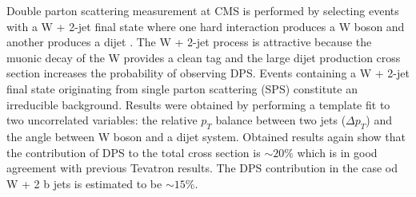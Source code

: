 \par Double parton scattering measurement at CMS is performed by selecting events with a W + 2-jet final state where one hard interaction produces a W boson and another produces a dijet \cite{Chatrchyan:2013xxa}. The W + 2-jet process is attractive because the muonic decay of the W provides a clean tag and the large dijet production cross section increases the probability of observing DPS. Events containing a W + 2-jet final state originating from single parton scattering (SPS) constitute an irreducible background. Results were obtained by performing a template fit to two uncorrelated variables: the relative $p_T$ balance between two jets ($\Delta p_T$) and the angle between W boson and a dijet system. Obtained results again show that the contribution of DPS to the total cross section is $\sim 20\%$ which is in good agreement with previous Tevatron results. The DPS contribution in the case od W + 2 b jets is estimated to be $\sim 15\%$. \cite{Chatrchyan:2013uza}


